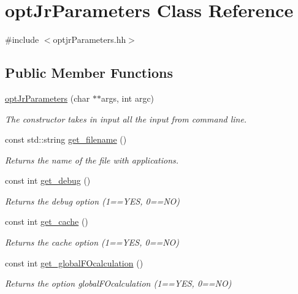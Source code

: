 \hypertarget{classoptJrParameters}{\section{opt\-Jr\-Parameters Class Reference}
\label{classoptJrParameters}
}


{\ttfamily \#include $<$optjr\-Parameters.\-hh$>$}

\subsection*{Public Member Functions}
\begin{DoxyCompactItemize}
\item 
\hyperlink{classoptJrParameters_a76f806d48141b4b4c7a215c2645011de}{opt\-Jr\-Parameters} (char $\ast$$\ast$args, int argc)
\begin{DoxyCompactList}\small\item\em The constructor takes in input all the input from command line. \end{DoxyCompactList}\item 
const std\-::string \hyperlink{classoptJrParameters_a8dcc738e721b3df88c2622712ed83414}{get\-\_\-filename} ()
\begin{DoxyCompactList}\small\item\em Returns the name of the file with applications. \end{DoxyCompactList}\item 
const int \hyperlink{classoptJrParameters_a64016f274261a7a7d74d8460bb7e2ee4}{get\-\_\-debug} ()
\begin{DoxyCompactList}\small\item\em Returns the debug option (1==Y\-E\-S, 0==N\-O) \end{DoxyCompactList}\item 
const int \hyperlink{classoptJrParameters_ac698812fa1177c71eb46dc61d2e5af77}{get\-\_\-cache} ()
\begin{DoxyCompactList}\small\item\em Returns the cache option (1==Y\-E\-S, 0==N\-O) \end{DoxyCompactList}\item 
const int \hyperlink{classoptJrParameters_a7eec5151603fd03276b6fcf6213f9f90}{get\-\_\-global\-F\-Ocalculation} ()
\begin{DoxyCompactList}\small\item\em Returns the option global\-F\-Ocalculation (1==Y\-E\-S, 0==N\-O) \end{DoxyCompactList}\item 
$$
\end{DoxyCompactItemize}
